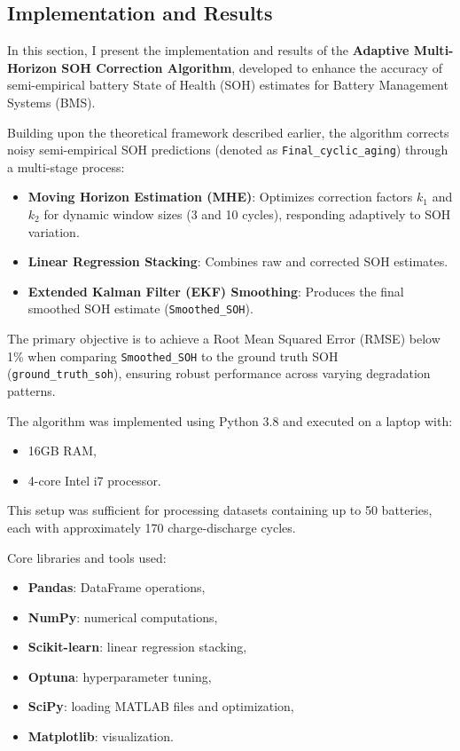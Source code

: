 \subsection{Implementation and Results}
In this section, I present the implementation and results of the \textbf{Adaptive Multi-Horizon SOH Correction Algorithm}, developed to enhance the accuracy of semi-empirical battery State of Health (SOH) estimates for Battery Management Systems (BMS).

Building upon the theoretical framework described earlier, the algorithm corrects noisy semi-empirical SOH predictions (denoted as \texttt{Final\_cyclic\_aging}) through a multi-stage process:
\begin{itemize}
    \item \textbf{Moving Horizon Estimation (MHE)}: Optimizes correction factors $k_1$ and $k_2$ for dynamic window sizes (3 and 10 cycles), responding adaptively to SOH variation.
    \item \textbf{Linear Regression Stacking}: Combines raw and corrected SOH estimates.
    \item \textbf{Extended Kalman Filter (EKF) Smoothing}: Produces the final smoothed SOH estimate (\texttt{Smoothed\_SOH}).
\end{itemize}

The primary objective is to achieve a Root Mean Squared Error (RMSE) below 1\% when comparing \texttt{Smoothed\_SOH} to the ground truth SOH (\texttt{ground\_truth\_soh}), ensuring robust performance across varying degradation patterns.

The algorithm was implemented using Python 3.8 and executed on a laptop with:
\begin{itemize}
    \item 16GB RAM,
    \item 4-core Intel i7 processor.
\end{itemize}

This setup was sufficient for processing datasets containing up to 50 batteries, each with approximately 170 charge-discharge cycles.

Core libraries and tools used:
\begin{itemize}
    \item \textbf{Pandas}: DataFrame operations,
    \item \textbf{NumPy}: numerical computations,
    \item \textbf{Scikit-learn}: linear regression stacking,
    \item \textbf{Optuna}: hyperparameter tuning,
    \item \textbf{SciPy}: loading MATLAB files and optimization,
    \item \textbf{Matplotlib}: visualization.
\end{itemize}

